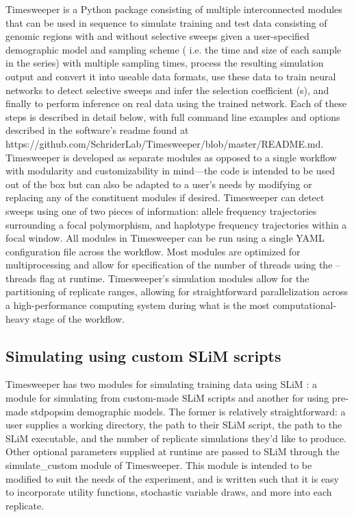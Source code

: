 Timesweeper is a Python package consisting of multiple interconnected modules that can be used in sequence to simulate training and test data consisting of genomic regions with and without selective sweeps given a user-specified demographic model and sampling scheme ( i.e. the time and size of each sample in the series) with multiple sampling times, process the resulting simulation output and convert it into useable data formats, use these data to train neural networks to detect selective sweeps and infer the selection coefficient (s), and finally to perform inference on real data using the trained network. Each of these steps is described in detail below, with full command line examples and options described in the software’s readme found at https://github.com/SchriderLab/Timesweeper/blob/master/README.md. Timesweeper is developed as separate modules as opposed to a single workflow with modularity and customizability in mind—the code is intended to be used out of the box but can also be adapted to a user’s needs by modifying or replacing any of the constituent modules if desired. Timesweeper can detect sweeps using one of two pieces of information: allele frequency trajectories surrounding a focal polymorphism, and haplotype frequency trajectories within a focal window. All modules in Timesweeper can be run using a single YAML configuration file across the workflow. Most modules are optimized for multiprocessing and allow for specification of the number of threads using the --threads flag at runtime. Timesweeper’s simulation modules allow for the partitioning of replicate ranges, allowing for straightforward parallelization across a high-performance computing system during what is the most computational-heavy stage of the workflow. \\

\subsection{Simulating using custom SLiM scripts}

Timesweeper has two modules for simulating training data using SLiM \cite{hallerSLiMForwardGenetic2019}: a module for simulating from custom-made SLiM scripts and another for using pre-made stdpopsim \cite{adrionCommunitymaintainedStandardLibrary2020} demographic models. The former is relatively straightforward: a user supplies a working directory, the path to their SLiM script, the path to the SLiM executable, and the number of replicate simulations they’d like to produce. Other optional parameters supplied at runtime are passed to SLiM through the simulate\_custom module of Timesweeper. This module is intended to be modified to suit the needs of the experiment, and is written such that it is easy to incorporate utility functions, stochastic variable draws, and more into each replicate. 

